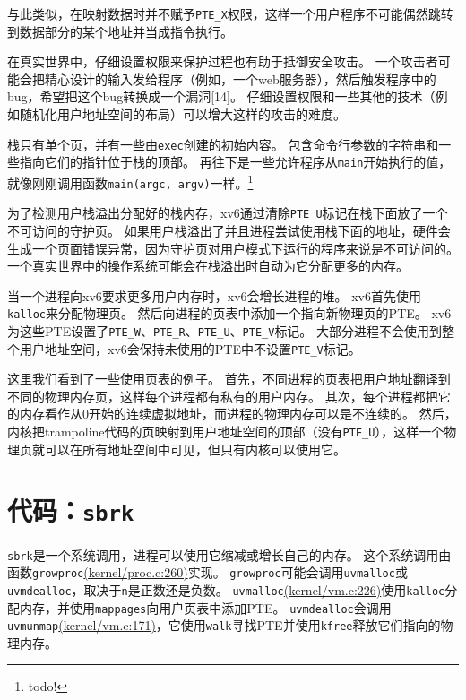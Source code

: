 与此类似，在映射数据时并不赋予\texttt{PTE\_X}权限，这样一个用户程序不可能偶然跳转到数据部分的某个地址并当成指令执行。

在真实世界中，仔细设置权限来保护过程也有助于抵御安全攻击。
一个攻击者可能会把精心设计的输入发给程序（例如，一个web服务器），然后触发程序中的bug，希望把这个bug转换成一个漏洞[14]。
仔细设置权限和一些其他的技术（例如随机化用户地址空间的布局）可以增大这样的攻击的难度。

栈只有单个页，并有一些由\texttt{exec}创建的初始内容。
包含命令行参数的字符串和一些指向它们的指针位于栈的顶部。
再往下是一些允许程序从\texttt{main}开始执行的值，就像刚刚调用函数\texttt{main(argc, argv)}一样。\footnote{todo!}

为了检测用户栈溢出分配好的栈内存，xv6通过清除\texttt{PTE\_U}标记在栈下面放了一个不可访问的守护页。
如果用户栈溢出了并且进程尝试使用栈下面的地址，硬件会生成一个页面错误异常，因为守护页对用户模式下运行的程序来说是不可访问的。
一个真实世界中的操作系统可能会在栈溢出时自动为它分配更多的内存。

当一个进程向xv6要求更多用户内存时，xv6会增长进程的堆。
xv6首先使用\texttt{kalloc}来分配物理页。
然后向进程的页表中添加一个指向新物理页的PTE。
xv6为这些PTE设置了\texttt{PTE\_W}、\texttt{PTE\_R}、\texttt{PTE\_U}、\texttt{PTE\_V}标记。
大部分进程不会使用到整个用户地址空间，xv6会保持未使用的PTE中不设置\texttt{PTE\_V}标记。

这里我们看到了一些使用页表的例子。
首先，不同进程的页表把用户地址翻译到不同的物理内存页，这样每个进程都有私有的用户内存。
其次，每个进程都把它的内存看作从0开始的连续虚拟地址，而进程的物理内存可以是不连续的。
然后，内核把trampoline代码的页映射到用户地址空间的顶部（没有\texttt{PTE\_U}），这样一个物理页就可以在所有地址空间中可见，但只有内核可以使用它。

\section{代码：\texttt{sbrk}}
\texttt{sbrk}是一个系统调用，进程可以使用它缩减或增长自己的内存。
这个系统调用由函数\texttt{growproc}\href{https://github.com/mit-pdos/xv6-riscv/blob/riscv//kernel/proc.c#L260}{(kernel/proc.c:260)}实现。
\texttt{growproc}可能会调用\texttt{uvmalloc}或\texttt{uvmdealloc}，取决于\texttt{n}是正数还是负数。
\texttt{uvmalloc}\href{https://github.com/mit-pdos/xv6-riscv/blob/riscv//kernel/vm.c#L226}{(kernel/vm.c:226)}使用\texttt{kalloc}分配内存，并使用\texttt{mappages}向用户页表中添加PTE。
\texttt{uvmdealloc}会调用\texttt{uvmunmap}\href{https://github.com/mit-pdos/xv6-riscv/blob/riscv//kernel/vm.c#L171}{(kernel/vm.c:171)}，它使用\texttt{walk}寻找PTE并使用\texttt{kfree}释放它们指向的物理内存。

